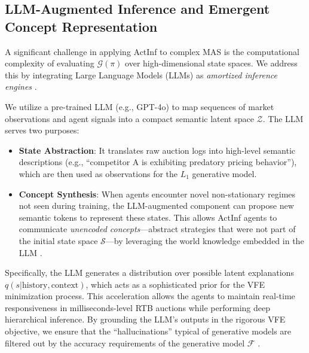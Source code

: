 \subsection{LLM-Augmented Inference and Emergent Concept Representation}
\label{sec:llm_inference}

A significant challenge in applying ActInf to complex MAS is the computational complexity of evaluating $\mathcal{G}(\pi)$ over high-dimensional state spaces. We address this by integrating Large Language Models (LLMs) as \textit{amortized inference engines} \cite{hu2023language, wang2024active}. 

We utilize a pre-trained LLM (e.g., GPT-4o) to map sequences of market observations and agent signals into a compact semantic latent space $\mathcal{Z}$. The LLM serves two purposes:
\begin{itemize}
    \item \textbf{State Abstraction}: It translates raw auction logs into high-level semantic descriptions (e.g., ``competitor A is exhibiting predatory pricing behavior''), which are then used as observations for the $L_1$ generative model.
    \item \textbf{Concept Synthesis}: When agents encounter novel non-stationary regimes not seen during training, the LLM-augmented component can propose new semantic tokens to represent these states. This allows ActInf agents to communicate \textit{unencoded concepts}—abstract strategies that were not part of the initial state space $\mathcal{S}$—by leveraging the world knowledge embedded in the LLM \cite{wei2022chain}.
\end{itemize}

Specifically, the LLM generates a distribution over possible latent explanations $q(s | \text{history}, \text{context})$, which acts as a sophisticated prior for the VFE minimization process. This acceleration allows the agents to maintain real-time responsiveness in milliseconds-level RTB auctions while performing deep hierarchical inference. By grounding the LLM's outputs in the rigorous VFE objective, we ensure that the ``hallucinations'' typical of generative models are filtered out by the accuracy requirements of the generative model $\mathcal{F}$ \cite{fountas2020active}.